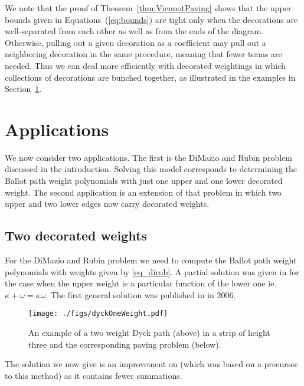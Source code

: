 \documentclass[11pt,a4paper]{article}
\begin{document}
We note that the proof of Theorem~\ref{thm:ViennotPaving} shows that the upper bounds given in Equations~(\ref{eq:bounds}) are tight only when the decorations are well-separated from each other as well as from the ends of the diagram.  Otherwise, pulling out a given decoration as a coefficient may pull out a neighboring decoration in the same procedure, meaning that fewer terms are needed.  Thus we can deal more efficiently with decorated weightings in which collections of decorations are bunched together, as illustrated in the examples in Section~\ref{sec:applications}.


\section{Applications}\label{sec:applications}  %
\label{sec:apps}

We now consider two applications. The first is the DiMazio and Rubin problem discussed in the introduction. Solving this model  corresponds to determining the Ballot path weight polynomials with just one upper and one lower decorated weight. The second application is an extension of that problem in which two upper and two lower edges now carry decorated weights.  


\subsection{Two decorated weights}	%

For the DiMazio and Rubin problem we need to compute the Ballot path weight polynomials with weights given by \eqref{eq_dirub}. A partial solution was given in  \cite{brak:2005fa} for the case when the upper weight is a particular function of the lower one ie.\ $\kappa+\omega=\kappa\omega$.  The first general solution was published in \cite{brak:2006kx}  in 2006.
%
\begin{figure}[htbp] 
\begin{center}
\texttt{[image: ./figs/dyckOneWeight.pdf]}
\caption{An example of a two weight Dyck path (above) in a strip of height three and the corresponding paving problem (below).}
\label{fig:dyckOneWeight}
\end{center}
\end{figure}
%
The solution we now give is an improvement on  \cite{brak:2006kx}  (which was based on a precursor to this method) as it contains fewer summations.  
\end{document}
